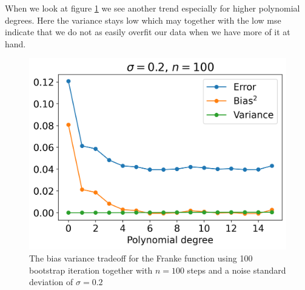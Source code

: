\documentclass[12pt]{article}
\begin{document}
When we look at figure \ref{fig:bias_variance_100} we see another trend especially for higher polynomial degrees. Here the variance stays low which may together with the low mse indicate that we do not as easily overfit our data when we have more of it at hand.
\begin{figure}[H]
  \centering
  \includegraphics[width=\textwidth]{../figures/bias_variance_100.png}
  \caption{The bias variance tradeoff for the Franke function using 100 bootstrap iteration together with $n=100$ steps and a noise standard deviation of $\sigma=0.2$}
  \label{fig:bias_variance_100}
\end{figure}
\end{document}
